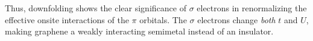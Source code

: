 Thus, downfolding shows the clear significance of $\sigma$ electrons in renormalizing the effective onsite interactions of the $\pi$ orbitals. 
The $\sigma$ electrons change \textit{both} $t$ and $U$, making graphene a weakly interacting semimetal instead of an insulator.
